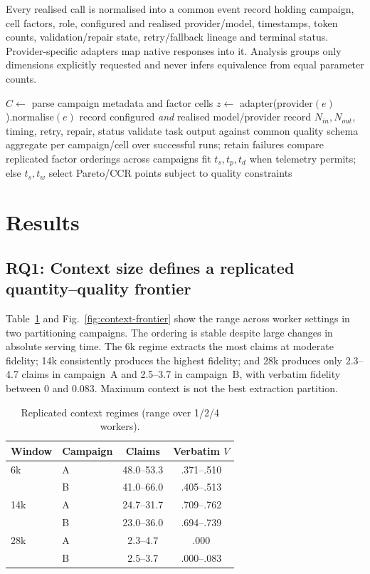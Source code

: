 \documentclass[conference]{IEEEtran}
\begin{document}
Every realised call is normalised into a common event record holding campaign, cell factors, role, configured and realised provider/model, timestamps, token counts, validation/repair state, retry/fallback lineage and terminal status. Provider-specific adapters map native responses into it. Analysis groups only dimensions explicitly requested and never infers equivalence from equal parameter counts.

\begin{algorithm}[t]
\caption{Provider-neutral cross-campaign evaluation}
\label{alg:generic}
\scriptsize
\begin{algorithmic}[1]
  \State $C\gets$ parse campaign metadata and factor cells
    \State $z\gets$ adapter(provider$(e)$).normalise$(e)$
    \State record configured \emph{and} realised model/provider
    \State record $N_{in},N_{out}$, timing, retry, repair, status
  \EndFor
  \State validate task output against common quality schema
\EndFor
\State aggregate per campaign/cell over successful runs; retain failures
\State compare replicated factor orderings across campaigns
\State fit $t_s,t_p,t_d$ when telemetry permits; else $t_s,t_w$
\State select Pareto/CCR points subject to quality constraints
\end{algorithmic}
\end{algorithm}

\section{Results}
\subsection{RQ1: Context size defines a replicated quantity--quality frontier}
\label{sec:context}
Table~\ref{tab:context} and Fig.~\ref{fig:context-frontier} show the range across worker settings in two partitioning campaigns. The ordering is stable despite large changes in absolute serving time. The 6k regime extracts the most claims at moderate fidelity; 14k consistently produces the highest fidelity; and 28k produces only 2.3--4.7 claims in campaign~A and 2.5--3.7 in campaign~B, with verbatim fidelity between 0 and 0.083. Maximum context is not the best extraction partition.

\begin{table}[t]
\caption{Replicated context regimes (range over 1/2/4 workers).}
\label{tab:context}
\centering\scriptsize
\begin{tabular}{llcc}
\toprule
Window & Campaign & Claims & Verbatim $V$\\
\midrule
6k & A & 48.0--53.3 & .371--.510\\
   & B & 41.0--66.0 & .405--.513\\
14k & A & 24.7--31.7 & .709--.762\\
    & B & 23.0--36.0 & .694--.739\\
28k & A & 2.3--4.7 & .000\\
    & B & 2.5--3.7 & .000--.083\\
\bottomrule
\end{tabular}
\end{table}
\end{document}
